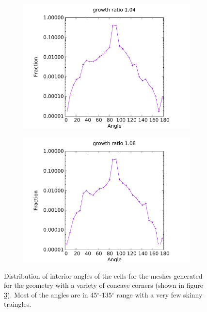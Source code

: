 \begin{figure}
	\centering
	\begin{subfigure}{0.5\textwidth}
		\centering
		\includegraphics[width=0.9\linewidth]{img/r/variousAngle-x0.5-g1.04/angleDistribution.pdf}
		\caption{}
		\label{fig-va-dist-low}
	\end{subfigure}%
	\begin{subfigure}{0.5\textwidth}
		\centering
		\includegraphics[width = 0.9\linewidth]{img/r/variousAngle-x0.3-g1.08/angleDistribution.pdf}
		\caption{}
		\label{fig-va-dist-high}
	\end{subfigure}
	\caption{Distribution of interior angles of the cells for the meshes generated for the geometry with a variety of concave corners (shown in figure \ref{fig-variousAngle}). Most of the angles are in 45$^\circ$-135$^\circ$ range with a very few skinny traingles.}
	\label{fig-variousAngle}
\end{figure}

